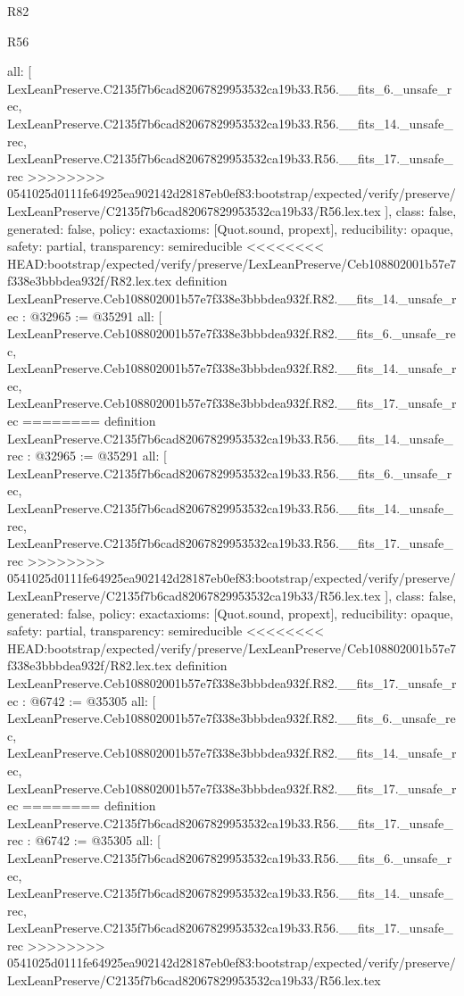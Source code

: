 \begin{lexlean}{R82}
\begin{lexlean}{R56}
\begin{coremodule}
{{{{{{{{{{{{{{{{{{{{{{{{{{{{{{{{{{{{{{{{{{{{{{{{{{{{{{{{{{{{{{{{{{{{{{{{{{{{{{{{{{{{{{{{{{{{{{{{{{{{{{{{{{{{{{{{{{{{{{{{{{{{{{{{{{{{{{{{{{{{{{{{{{{{{{{{{{{{{{{{{{  all: [
    LexLeanPreserve.C2135f7b6cad82067829953532ca19b33.R56.__fits_6._unsafe_rec,
    LexLeanPreserve.C2135f7b6cad82067829953532ca19b33.R56.__fits_14._unsafe_rec,
    LexLeanPreserve.C2135f7b6cad82067829953532ca19b33.R56.__fits_17._unsafe_rec
>>>>>>>> 0541025d0111fe64925ea902142d28187eb0ef83:bootstrap/expected/verify/preserve/LexLeanPreserve/C2135f7b6cad82067829953532ca19b33/R56.lex.tex
  ],
  class: false,
  generated: false,
  policy: exact{axioms: [Quot.sound, propext]},
  reducibility: opaque{},
  safety: partial,
  transparency: semireducible
}
<<<<<<<< HEAD:bootstrap/expected/verify/preserve/LexLeanPreserve/Ceb108802001b57e7f338e3bbbdea932f/R82.lex.tex
definition LexLeanPreserve.Ceb108802001b57e7f338e3bbbdea932f.R82.__fits_14._unsafe_rec : @32965 := @35291 {
  all: [
    LexLeanPreserve.Ceb108802001b57e7f338e3bbbdea932f.R82.__fits_6._unsafe_rec,
    LexLeanPreserve.Ceb108802001b57e7f338e3bbbdea932f.R82.__fits_14._unsafe_rec,
    LexLeanPreserve.Ceb108802001b57e7f338e3bbbdea932f.R82.__fits_17._unsafe_rec
========
definition LexLeanPreserve.C2135f7b6cad82067829953532ca19b33.R56.__fits_14._unsafe_rec : @32965 := @35291 {
  all: [
    LexLeanPreserve.C2135f7b6cad82067829953532ca19b33.R56.__fits_6._unsafe_rec,
    LexLeanPreserve.C2135f7b6cad82067829953532ca19b33.R56.__fits_14._unsafe_rec,
    LexLeanPreserve.C2135f7b6cad82067829953532ca19b33.R56.__fits_17._unsafe_rec
>>>>>>>> 0541025d0111fe64925ea902142d28187eb0ef83:bootstrap/expected/verify/preserve/LexLeanPreserve/C2135f7b6cad82067829953532ca19b33/R56.lex.tex
  ],
  class: false,
  generated: false,
  policy: exact{axioms: [Quot.sound, propext]},
  reducibility: opaque{},
  safety: partial,
  transparency: semireducible
}
<<<<<<<< HEAD:bootstrap/expected/verify/preserve/LexLeanPreserve/Ceb108802001b57e7f338e3bbbdea932f/R82.lex.tex
definition LexLeanPreserve.Ceb108802001b57e7f338e3bbbdea932f.R82.__fits_17._unsafe_rec : @6742 := @35305 {
  all: [
    LexLeanPreserve.Ceb108802001b57e7f338e3bbbdea932f.R82.__fits_6._unsafe_rec,
    LexLeanPreserve.Ceb108802001b57e7f338e3bbbdea932f.R82.__fits_14._unsafe_rec,
    LexLeanPreserve.Ceb108802001b57e7f338e3bbbdea932f.R82.__fits_17._unsafe_rec
========
definition LexLeanPreserve.C2135f7b6cad82067829953532ca19b33.R56.__fits_17._unsafe_rec : @6742 := @35305 {
  all: [
    LexLeanPreserve.C2135f7b6cad82067829953532ca19b33.R56.__fits_6._unsafe_rec,
    LexLeanPreserve.C2135f7b6cad82067829953532ca19b33.R56.__fits_14._unsafe_rec,
    LexLeanPreserve.C2135f7b6cad82067829953532ca19b33.R56.__fits_17._unsafe_rec
>>>>>>>> 0541025d0111fe64925ea902142d28187eb0ef83:bootstrap/expected/verify/preserve/LexLeanPreserve/C2135f7b6cad82067829953532ca19b33/R56.lex.tex
}}}}}}}}}}}}}}}}}}}}}}}}}}}}}}}}}}}}}}}}}}}}}}}}}}}}}}}}}}}}}}}}}}}}}}}}}}}}}}}}}}}}}}}}}}}}}}}}}}}}}}}}}}}}}}}}}}}}}}}}}}}}}}}}}}}}}}}}}}}}}}}}}}}}}}}}}}}}}}}}}}}}
\end{coremodule}
\end{lexlean}
\end{lexlean}
